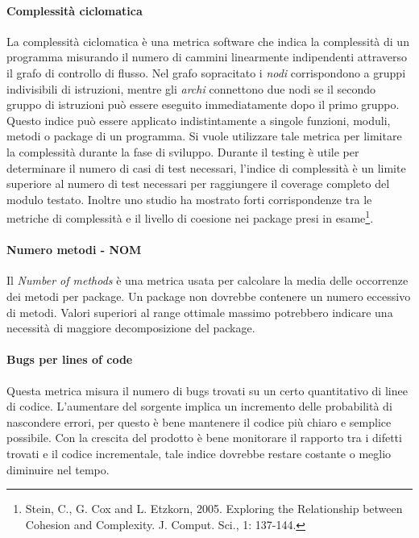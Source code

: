 			\paragraph{Complessità ciclomatica}
			La complessità ciclomatica è una metrica software che indica la complessità di un programma misurando il numero di cammini linearmente indipendenti attraverso il grafo di controllo di flusso. Nel grafo sopracitato i \emph{nodi} corrispondono a gruppi indivisibili di istruzioni, mentre gli \emph{archi} connettono due nodi se il secondo gruppo di istruzioni può essere eseguito immediatamente dopo il primo gruppo.
			Questo indice può essere applicato indistintamente a singole funzioni, moduli, metodi o package di un programma.
			Si vuole utilizzare tale metrica per limitare la complessità durante la fase di sviluppo.
			Durante il testing è utile per determinare il numero di casi di test necessari, l'indice di complessità è un limite superiore al numero di test necessari per raggiungere il coverage completo del modulo testato. Inoltre uno studio ha mostrato forti corrispondenze tra le metriche di complessità e il livello di coesione nei package presi in esame\footnote{Stein, C., G. Cox and L. Etzkorn, 2005. Exploring the Relationship between Cohesion and Complexity. J. Comput. Sci., 1: 137-144.}.\\
			
			\paragraph{Numero metodi - NOM}
			Il \emph{Number of methods} è una metrica usata per calcolare la media delle occorrenze dei metodi per package. Un package non dovrebbe contenere un numero eccessivo di metodi. Valori superiori al range ottimale massimo potrebbero indicare una necessità di maggiore decomposizione del package.\\

			
			\paragraph{Bugs per lines of code}
			Questa metrica misura il numero di bugs trovati su un certo quantitativo di linee di codice. L'aumentare del sorgente implica un incremento delle probabilità di nascondere errori, per questo è bene mantenere il codice più chiaro e semplice possibile. Con la crescita del prodotto è bene monitorare il rapporto tra i difetti trovati e il codice incrementale, tale indice dovrebbe restare costante o meglio diminuire nel tempo. 
			
